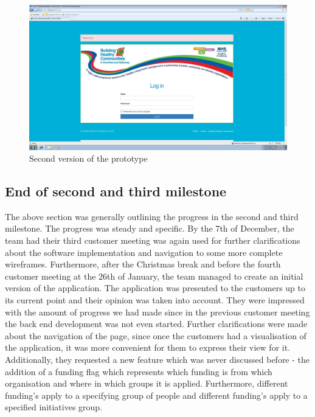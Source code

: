 \documentclass{l3proj}
\begin{document}
\begin{figure}[h]
\centerline{\includegraphics[width=\textwidth, height=\textheight, keepaspectratio]{newhome.png}}
\caption{Second version of the prototype}
\label{fig:newhome}
\end{figure}




\subsection{End of second and third milestone}
\label{sec:milestone23}

The above section was generally outlining the progress in the second and third milestone. The progress was steady and specific. By the 7th of December, the team had their third customer meeting was again used for further clarifications about the software implementation and navigation to some more complete wireframes. Furthermore, after the Christmas break and before the fourth customer meeting at the 26th of January, the team managed to create an initial version of the application. The application was presented to the customers up to its current point and their opinion was taken into account. They were impressed with the amount of progress we had made since in the previous customer meeting the back end development was not even started. Further clarifications were made about the navigation of the page, since once the customers had a visualisation of the application, it was more convenient for them to express their view for it. Additionally, they requested a new feature which was never discussed before - the addition of a funding flag which represents which funding is from which organisation and where in which groups it is applied. Furthermore, different funding's apply to a specifying group of people and different funding's apply to a specified initiatives group.
\end{document}
